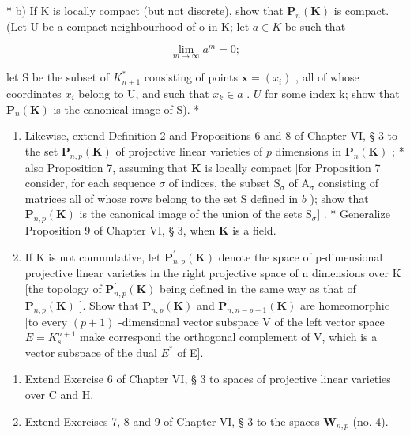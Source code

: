 * b) If K is locally compact (but not discrete), show that \(\mathbf{P}_{n}(\mathbf{K})\) is compact. (Let U be a compact neighbourhood of o in K; let \(a \in K\) be such that

\[
\lim _ {m \rightarrow \infty} a ^ {m} = 0;
\]

let S be the subset of \(K_{n+1}^{*}\) consisting of points \(\boldsymbol{x} = (x_{i})\) , all of whose coordinates \(x_{i}\) belong to U, and such that \(x_{k} \in a\) . \(\overline{U}\) for some index k; show that \(\mathbf{P}_{n}(\mathbf{K})\) is the canonical image of S). *

\begin{enumerate}
\def\labelenumi{\alph{enumi})}
\setcounter{enumi}{2}
\item
  Likewise, extend Definition 2 and Propositions 6 and 8 of Chapter VI, § 3 to the set \(\mathbf{P}_{n,p}(\mathbf{K})\) of projective linear varieties of \(p\) dimensions in \(\mathbf{P}_n(\mathbf{K})\) ; * also Proposition 7, assuming that \(\mathbf{K}\) is locally compact {[}for Proposition 7 consider, for each sequence \(\sigma\) of indices, the subset \(\mathrm{S}_{\sigma}\) of \(\mathrm{A}_{\sigma}\) consisting of matrices all of whose rows belong to the set S defined in \(b\) ); show that \(\mathbf{P}_{n,p}(\mathbf{K})\) is the canonical image of the union of the sets \(\mathrm{S}_{\sigma}]\) . * Generalize Proposition 9 of Chapter VI, § 3, when \(\mathbf{K}\) is a field.
\item
  If K is not commutative, let \(\mathbf{P}_{n,p}^{\prime}(\mathbf{K})\) denote the space of p-dimensional projective linear varieties in the right projective space of n dimensions over K {[}the topology of \(\mathbf{P}_{n,p}^{\prime}(\mathbf{K})\) being defined in the same way as that of \(\mathbf{P}_{n,p}(\mathbf{K})\) {]}. Show that \(\mathbf{P}_{n,p}(\mathbf{K})\) and \(\mathbf{P}_{n,n-p-1}^{\prime}(\mathbf{K})\) are homeomorphic {[}to every \((p+1)\) -dimensional vector subspace V of the left vector space \(E=K_{s}^{n+1}\) make correspond the orthogonal complement of V, which is a vector subspace of the dual \(E^{*}\) of E{]}.
\end{enumerate}

\begin{enumerate}
\def\labelenumi{\arabic{enumi})}
\setcounter{enumi}{6}
\item
  Extend Exercise 6 of Chapter VI, § 3 to spaces of projective linear varieties over C and H.
\item
  Extend Exercises 7, 8 and 9 of Chapter VI, § 3 to the spaces \(\mathbf{W}_{n,p}\) (no. 4).
\end{enumerate}

